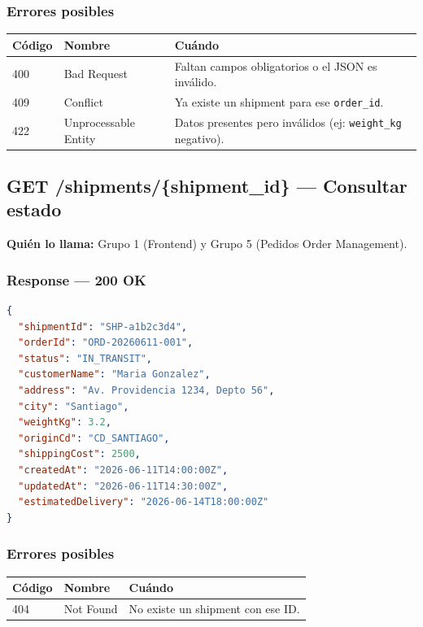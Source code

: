 \documentclass[11pt, a4paper]{article}
\begin{document}
\subsubsection*{Errores posibles}
\begin{table}[h!]
\centering
\begin{tabularx}{\textwidth}{l l X}
  \toprule
  \textbf{Código} & \textbf{Nombre} & \textbf{Cuándo} \\
  \midrule
  400 & Bad Request             & Faltan campos obligatorios o el JSON es inválido. \\
  409 & Conflict                & Ya existe un shipment para ese \texttt{order\_id}. \\
  422 & Unprocessable Entity    & Datos presentes pero inválidos (ej: \texttt{weight\_kg} negativo). \\
  \bottomrule
\end{tabularx}
\end{table}

\subsection{GET /shipments/\{shipment\_id\} --- Consultar estado}

\textbf{Quién lo llama:} Grupo 1 (Frontend) y Grupo 5 (Pedidos Order Management).

\subsubsection*{Response --- 200 OK}
\begin{lstlisting}[language=json]
{
  "shipmentId": "SHP-a1b2c3d4",
  "orderId": "ORD-20260611-001",
  "status": "IN_TRANSIT",
  "customerName": "Maria Gonzalez",
  "address": "Av. Providencia 1234, Depto 56",
  "city": "Santiago",
  "weightKg": 3.2,
  "originCd": "CD_SANTIAGO",
  "shippingCost": 2500,
  "createdAt": "2026-06-11T14:00:00Z",
  "updatedAt": "2026-06-11T14:30:00Z",
  "estimatedDelivery": "2026-06-14T18:00:00Z"
}
\end{lstlisting}

\subsubsection*{Errores posibles}
\begin{table}[h!]
\centering
\begin{tabularx}{\textwidth}{l l X}
  \toprule
  \textbf{Código} & \textbf{Nombre} & \textbf{Cuándo} \\
  \midrule
  404 & Not Found & No existe un shipment con ese ID. \\
  \bottomrule
\end{tabularx}
\end{table}
\end{document}
